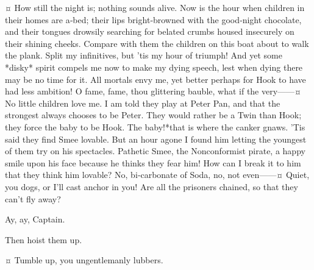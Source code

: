 \begin{drama}

\hookspeaks {}¤
How still the night is; nothing sounds alive.
Now is the hour when children in their homes are a‐bed;
their lips bright‐browned with the good‐night chocolate,
and their tongues drowsily searching for belated crumbs housed insecurely on their shining cheeks.
Compare with them the children on this boat about to walk the plank.
Split my infinitives, but ’tis my hour of triumph!
And yet some *disky* spirit compels me now to make my dying speech, lest when dying there may be no time for it.
All mortals envy me, yet better perhaps for Hook to have had less ambition!
O fame, fame, thou glittering bauble, what if the very——¤
No little children love me.
I am told they play at Peter Pan, and that the strongest always chooses to be Peter.
They would rather be a Twin than Hook; they force the baby to be Hook.
The baby!\@ *that is where the canker gnaws.
’Tis said they find Smee lovable.
But an hour agone I found him letting the youngest of them try on his spectacles.
Pathetic Smee, the Nonconformist pirate, a happy smile upon his face because he thinks they fear him!
How can I break it to him that they think him lovable?
No, bi‐carbonate of Soda, no, not even——¤
Quiet, you dogs, or I’ll cast anchor in you!
Are all the prisoners chained, so that they can’t fly away?

\jukesspeaks
Ay, ay, Captain.

\hookspeaks
Then hoist them up.

\starkeyspeaks {}¤
Tumble up, you ungentlemanly lubbers.



\end{drama}
